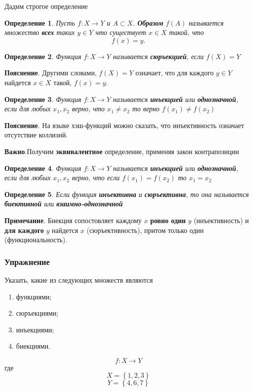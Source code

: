 \documentclass[]{article}
\newtheorem{dfn}{Определение}
\begin{document}
	Дадим строгое определение
	
	\begin{dfn}
		Пусть $f:X\rightarrow Y$ и $A\subset X$. \textbf{Образом} $f(A)$ называется множество \textbf{всех} таких $y\in Y$ что существует $x\in X$ такой, что $$f(x)=y.$$
	\end{dfn}
	
	\begin{dfn}
		Функция $f:X\rightarrow Y$ называется \textbf{сюръекцией}, если $f(X) = Y$
	\end{dfn}

	\textbf{Пояснение}. Другими словами, $f(X) = Y$ означает, что для каждого $y\in Y$ найдется $x\in X$ такой, $f(x)=y$.

	\begin{dfn}
	Функция $f:X\rightarrow Y$ называется \textbf{инъекцией} или \textbf{однозначной}, если для любых $x_1, x_2$ верно, что $x_1\not=x_2$ то верно $f(x_1)\not=f(x_2)$
	\end{dfn}

	\textbf{Пояснение}. На языке хэш-функций можно сказать, что инъективность означает отсутствие коллизий.
	
	\textbf{Важно}.Получим \textbf{эквивалентное} определение, применяя закон контрапозиции
	
	\begin{dfn}
		Функция $f:X\rightarrow Y$ называется \textbf{инъекцией} или \textbf{однозначной}, если для любых $x_1, x_2$ верно, что если $f(x_1)=f(x_2)$ то $x_1=x_2$
	\end{dfn}

	\begin{dfn}
		Если функция \textbf{инъективна} и \textbf{сюръективна}, то она называется \textbf{биективной} или \textbf{взаимно-однозначной}
	\end{dfn}
	
	\textbf{Примечание}. Биекция сопостовляет каждому $x$ \textbf{ровно один} $y$ (инъективность) и \textbf{для каждого} $y$ найдется $x$ (сюръективность), притом только один (функциональность).
	\subsubsection{Упражнение}
	Указать, какие из следующих множеств являются
	\begin{enumerate}
		\item функциями;
		\item сюръекциями;
		\item инъекциями;
		\item биекциями.
	\end{enumerate} $$f:X\rightarrow Y$$ где $$X=\left\{1,2,3\right\}$$  $$Y=\left\{4,6,7\right\}$$
	
\end{document}
